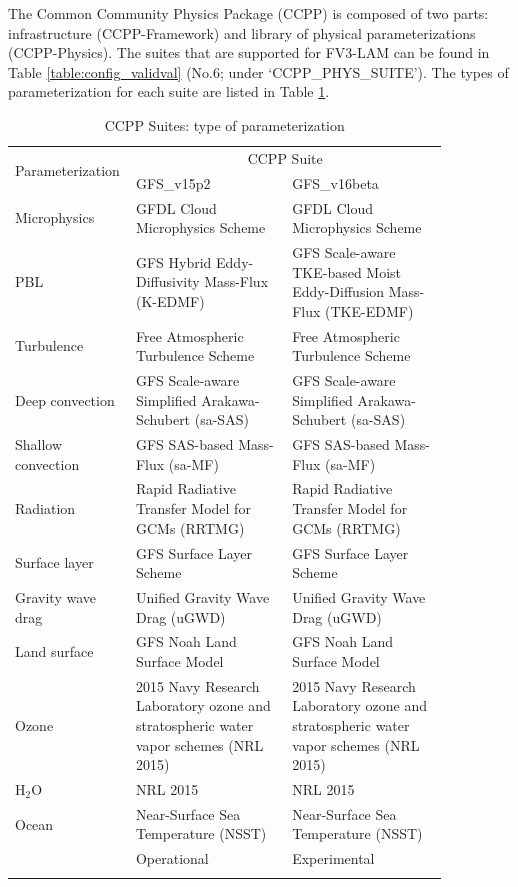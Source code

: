 \documentclass[11pt,fleqn]{report}              %
\begin{document}
The Common Community Physics Package (CCPP) is composed of two parts: infrastructure (CCPP-Framework) and library of physical parameterizations (CCPP-Physics). The suites that are supported for FV3-LAM can be found in Table \ref{table:config_validval} (No.6; under `CCPP\_PHYS\_SUITE'). The types of parameterization for each suite are listed in Table \ref{table:ccpp_suite_param}.

{
\fontsize{9}{11}\selectfont
\begin{longtable}{ p{0.16\linewidth} | p{0.35\linewidth} | p{0.35\linewidth}  }
\hline
\hline
\multirow{2}{*}{Parameterization} & \multicolumn{2}{c}{CCPP Suite}  \\ 
\cline{2-3}
 & GFS\_v15p2 & GFS\_v16beta  \\
\hline
Microphysics & GFDL Cloud Microphysics Scheme & GFDL Cloud Microphysics Scheme   \\
PBL & GFS Hybrid Eddy-Diffusivity Mass-Flux (K-EDMF) & GFS Scale-aware TKE-based Moist Eddy-Diffusion Mass-Flux (TKE-EDMF)  \\
Turbulence & Free Atmospheric Turbulence Scheme & Free Atmospheric Turbulence Scheme \\
Deep convection & GFS Scale-aware Simplified Arakawa-Schubert (sa-SAS) & GFS Scale-aware Simplified Arakawa-Schubert (sa-SAS)  \\
Shallow convection & GFS SAS-based Mass-Flux (sa-MF) & GFS SAS-based Mass-Flux (sa-MF)  \\
Radiation & Rapid Radiative Transfer Model for GCMs (RRTMG) & Rapid Radiative Transfer Model for GCMs (RRTMG)  \\
Surface layer & GFS Surface Layer Scheme & GFS Surface Layer Scheme  \\
Gravity wave drag & Unified Gravity Wave Drag (uGWD) & Unified Gravity Wave Drag (uGWD)  \\
Land surface & GFS Noah Land Surface Model & GFS Noah Land Surface Model  \\
Ozone & 2015 Navy Research Laboratory ozone and stratospheric water vapor schemes (NRL 2015) & 2015 Navy Research Laboratory ozone and stratospheric water vapor schemes (NRL 2015)   \\
H$_2$O & NRL 2015 & NRL 2015  \\
Ocean & Near-Surface Sea Temperature (NSST) & Near-Surface Sea Temperature (NSST)  \\
\hdashline
 & Operational & Experimental  \\
\hline
\caption{CCPP Suites: type of parameterization}
\label{table:ccpp_suite_param}
\end{longtable}
}
\end{document}
